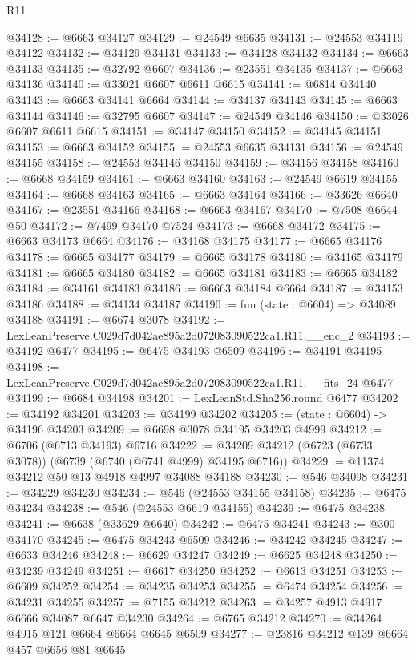 \begin{lexlean}{R11}
\begin{coremodule}
@34128 := @6663 @34127
@34129 := @24549 @6635
@34131 := @24553 @34119 @34122
@34132 := @34129 @34131
@34133 := @34128 @34132
@34134 := @6663 @34133
@34135 := @32792 @6607
@34136 := @23551 @34135
@34137 := @6663 @34136
@34140 := @33021 @6607 @6611 @6615
@34141 := @6814 @34140
@34143 := @6663 @34141 @6664
@34144 := @34137 @34143
@34145 := @6663 @34144
@34146 := @32795 @6607
@34147 := @24549 @34146
@34150 := @33026 @6607 @6611 @6615
@34151 := @34147 @34150
@34152 := @34145 @34151
@34153 := @6663 @34152
@34155 := @24553 @6635 @34131
@34156 := @24549 @34155
@34158 := @24553 @34146 @34150
@34159 := @34156 @34158
@34160 := @6668 @34159
@34161 := @6663 @34160
@34163 := @24549 @6619 @34155
@34164 := @6668 @34163
@34165 := @6663 @34164
@34166 := @33626 @6640
@34167 := @23551 @34166
@34168 := @6663 @34167
@34170 := @7508 @6644 @50
@34172 := @7499 @34170 @7524
@34173 := @6668 @34172
@34175 := @6663 @34173 @6664
@34176 := @34168 @34175
@34177 := @6665 @34176
@34178 := @6665 @34177
@34179 := @6665 @34178
@34180 := @34165 @34179
@34181 := @6665 @34180
@34182 := @6665 @34181
@34183 := @6665 @34182
@34184 := @34161 @34183
@34186 := @6663 @34184 @6664
@34187 := @34153 @34186
@34188 := @34134 @34187
@34190 := fun (state : @6604) => @34089 @34188
@34191 := @6674 @3078
@34192 := LexLeanPreserve.C029d7d042ae895a2d072083090522ca1.R11.__enc_2
@34193 := @34192 @6477
@34195 := @6475 @34193 @6509
@34196 := @34191 @34195
@34198 := LexLeanPreserve.C029d7d042ae895a2d072083090522ca1.R11.__fits_24 @6477
@34199 := @6684 @34198
@34201 := LexLeanStd.Sha256.round @6477
@34202 := @34192 @34201
@34203 := @34199 @34202
@34205 := (state : @6604) -> @34196 @34203
@34209 := @6698 @3078 @34195 @34203 @4999
@34212 := @6706 (@6713 @34193) @6716
@34222 := @34209 @34212 (@6723 (@6733 @3078)) (@6739 (@6740 (@6741 @4999) @34195 @6716))
@34229 := @11374 @34212 @50 @13 @4918 @4997 @34088 @34188
@34230 := @546 @34098
@34231 := @34229 @34230
@34234 := @546 (@24553 @34155 @34158)
@34235 := @6475 @34234
@34238 := @546 (@24553 @6619 @34155)
@34239 := @6475 @34238
@34241 := @6638 (@33629 @6640)
@34242 := @6475 @34241
@34243 := @300 @34170
@34245 := @6475 @34243 @6509
@34246 := @34242 @34245
@34247 := @6633 @34246
@34248 := @6629 @34247
@34249 := @6625 @34248
@34250 := @34239 @34249
@34251 := @6617 @34250
@34252 := @6613 @34251
@34253 := @6609 @34252
@34254 := @34235 @34253
@34255 := @6474 @34254
@34256 := @34231 @34255
@34257 := @7155 @34212
@34263 := @34257 @4913 @4917 @6666 @34087 @6647 @34230
@34264 := @6765 @34212
@34270 := @34264 @4915 @121 @6664 @6664 @6645 @6509
@34277 := @23816 @34212 @139 @6664 @457 @6656 @81 @6645

\end{coremodule}
\end{lexlean}
